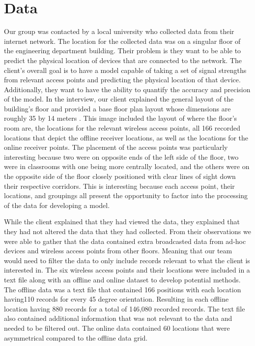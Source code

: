 \documentclass[12pt, conference]{IEEEtran}
\begin{document}
\section{Data}
Our group was contacted by a local university who collected data from their internet network. The location for the collected data was on a singular floor of the engineering department building. Their problem is they want to be able to predict the physical location of devices that are connected to the network. The client's overall goal is to have a model capable of taking a set of signal strengths from relevant access points and predicting the physical location of that device. Additionally, they want to have the ability to quantify the accuracy and precision of the model. In the interview, our client explained the general layout of the building's floor and provided a base floor plan layout whose dimensions are roughly 35 by 14 meters . This image included the layout of where the floor's room are, the locations for the relevant wireless access points, all 166 recorded locations that depict the offline receiver locations, as well as the locations for the online receiver points. The placement of the access points was particularly interesting because two were on opposite ends of the left side of the floor, two were in classrooms with one being more centrally located, and the others were on the opposite side of the floor closely positioned with clear lines of sight down their respective corridors. This is interesting because each access point, their locations, and groupings all present the opportunity to factor into the processing of the data for developing a model. 

While the client explained that they had viewed the data, they explained that they had not altered the data that they had collected. From their observations we were able to gather that the data contained extra broadcasted data from ad-hoc devices and wireless access points from other floors. Meaning that our team would need to filter the data to only include records relevant to what the client is interested in. The six wireless access points and their locations were included in a text file along with an offline and online dataset to develop potential methods. The offline data was a text file that contained 166 positions with each location having110 records for every 45 degree orientation. Resulting in each offline location having 880 records for a total of 146,080 recorded records. The text file also contained additional information that was not relevant to the data and needed to be filtered out. The online data contained 60 locations that were asymmetrical compared to the offline data grid. 
\end{document}
